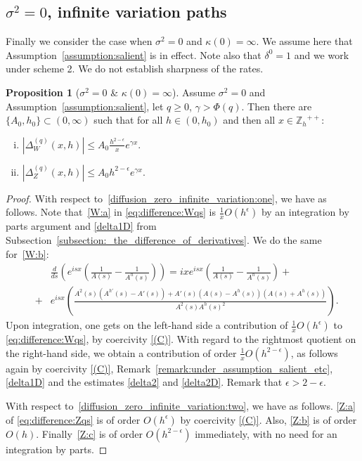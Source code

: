 \documentclass[pdftex,oneside,11pt,reqno]{amsart}
\theoremstyle{definition}
\theoremstyle{theorem}
\newtheorem{proposition}{Proposition}[section]
\theoremstyle{remark}
\numberwithin{equation}{section}
\numberwithin{definition}{section}
\begin{document}
\subsection{${\sigma^2}=0$, infinite variation paths}\label{subsection:sclaes:diffusion0infvariation}\label{subsection:scales:diffusion=0:infinite_variation}
Finally we consider the case when ${\sigma^2}=0$ and $\kappa(0)=\infty$. We assume here that Assumption~\ref{assumption:salient} is in effect. Note also that $\delta^0=1$ and we work under scheme 2. We do not establish sharpness of the rates. 

\begin{proposition}[${\sigma^2}=0$ \& $\kappa(0)=\infty$]\label{proposition:convergence:diffusion_zero_infinite_variation}
Assume ${\sigma^2}=0$ and Assumption~\ref{assumption:salient}, let $q\geq 0$, $\gamma>\Phi(q)$. Then there are $\{A_0,h_0\}\subset (0,\infty)$ such that for all $h\in (0,h_0)$ and then all $x\in {\mathbb{Z}_h}^{++}$: 
\begin{enumerate}[(i)]
\item\label{diffusion_zero_infinite_variation:one} $\left\vert{\Delta_{W}^{(q)}(x,h)}\right\vert\leq A_0\frac{h^{2-\epsilon}}{x}e^{\gamma x}$.
\item\label{diffusion_zero_infinite_variation:two} $\left\vert {\Delta_{Z}^{(q)}(x,h)}\right\vert\leq A_0 h^{2-\epsilon}e^{\gamma x}.$
\end{enumerate}
\end{proposition}
\begin{proof}

With respect to~\ref{diffusion_zero_infinite_variation:one}, we have as follows. Note that~\ref{W:a} in \eqref{eq:difference:Wqs} is $\frac{1}{x}O(h^\epsilon)$ by an integration by parts argument and \ref{delta1D} from Subsection~\ref{subsection:_the_difference_of_derivatives}. We do the same for~\ref{W:b}: 
\begin{eqnarray*}
&&\frac{d}{ds}\left(e^{isx}\left(\frac{1}{A(s)}-\frac{1}{A^h(s)}\right)\right)=ixe^{isx}\left(\frac{1}{A(s)}-\frac{1}{A^h(s)}\right)+\\
&+&e^{isx}\left(\frac{A^2(s)(A^{h\prime}(s)-A'(s))+A'(s)(A(s)-A^h(s))(A(s)+A^h(s))}{A^2(s)A^h(s)^2}\right).
\end{eqnarray*}
Upon integration, one gets on the left-hand side a contribution of $\frac{1}{x}O(h^\epsilon)$ to \eqref{eq:difference:Wqs}, by coercivity \ref{(C)}. With regard to the rightmost quotient on the right-hand side, we obtain a contribution of order $\frac{1}{x}O(h^{2-\epsilon})$, as follows again by coercivity \ref{(C)}, Remark~\ref{remark:under_assumption_salient_etc}, \ref{delta1D} and the estimates \ref{delta2} and \ref{delta2D}. Remark that $\epsilon> 2-\epsilon$. 

With respect to~\ref{diffusion_zero_infinite_variation:two}, we have as follows. \ref{Z:a} of \eqref{eq:difference:Zqs} is of order $O(h^\epsilon)$ by coercivity \ref{(C)}. Also, \ref{Z:b} is of order $O(h)$. Finally~\ref{Z:c} is of order $O(h^{2-\epsilon})$ immediately, with no need for an integration by parts. 
\end{proof}
\end{document}
